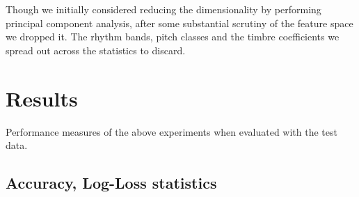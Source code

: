 \documentclass[fleqn,10pt]{SelfArx} %
\begin{document}
Though we initially considered reducing the dimensionality by performing principal component analysis, after some substantial scrutiny of the feature space we dropped it. The rhythm bands, pitch classes and the timbre coefficients we spread out across the statistics to discard.




\section{Results}

Performance measures of the above experiments when evaluated with the test data.

\subsection{Accuracy, Log-Loss statistics}
\end{document}
